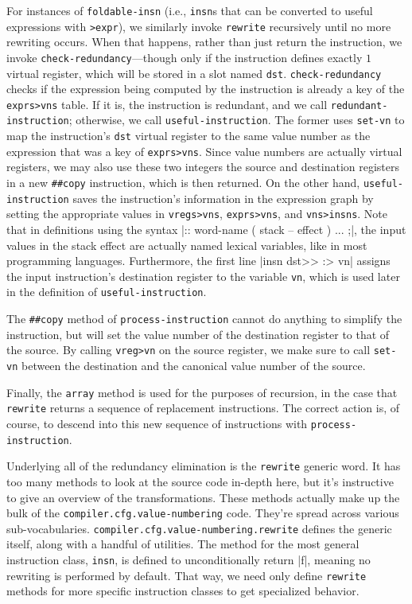 For instances of \Verb|foldable-insn| (i.e., \Verb|insn|s that can be
converted to useful expressions with \Verb|>expr|), we similarly invoke
\Verb|rewrite| recursively until no more rewriting occurs.  When that
happens, rather than just return the instruction, we invoke
\Verb|check-redundancy|---though only if the instruction defines exactly $1$
virtual register, which will be stored in a slot named \Verb|dst|.
\Verb|check-redundancy| checks if the expression being computed by the
instruction is already a key of the \Verb|exprs>vns| table.  If it is, the
instruction is redundant, and we call \Verb|redundant-instruction|;
otherwise, we call \Verb|useful-instruction|.  The former uses
\Verb|set-vn| to map the instruction's \Verb|dst| virtual register to the
same value number as the expression that was a key of \Verb|exprs>vns|.
Since value numbers are actually virtual registers, we may also use these two
integers the source and destination registers in a new \Verb|##copy|
instruction, which is then returned.  On the other hand,
\Verb|useful-instruction| saves the instruction's information in the
expression graph by setting the appropriate values in \Verb|vregs>vns|,
\Verb|exprs>vns|, and \Verb|vns>insns|.  Note that in definitions using the
syntax
%
\factor|:: word-name ( stack -- effect ) ... ;|,
%
the input values in the stack effect are actually named lexical variables, like
in most programming languages.  Furthermore, the
first line
%
\factor|insn dst>> :> vn|
%
assigns the input instruction's destination register to the variable
\Verb|vn|, which is used later in the definition of
\Verb|useful-instruction|.

The \Verb|##copy| method of \Verb|process-instruction| cannot do anything
to simplify the instruction, but will set the value number of the destination
register to that of the source.  By calling \Verb|vreg>vn| on the source
register, we make sure to call \Verb|set-vn| between the destination and the
canonical value number of the source.

Finally, the \Verb|array| method is used for the purposes of recursion, in
the case that \Verb|rewrite| returns a sequence of replacement instructions.
The correct action is, of course, to descend into this new sequence of
instructions with \Verb|process-instruction|.

Underlying all of the redundancy elimination is the \Verb|rewrite| generic
word.  It has too many methods to look at the source code in-depth here, but
it's instructive to give an overview of the transformations.  These methods
actually make up the bulk of the \Verb|compiler.cfg.value-numbering| code.
They're spread across various sub-vocabularies.
\Verb|compiler.cfg.value-numbering.rewrite| defines the generic itself, along
with a handful of utilities.  The method for the most general instruction
class, \Verb|insn|, is defined to unconditionally return \factor|f|, meaning
no rewriting is performed by default.  That way, we need only define
\Verb|rewrite| methods for more specific instruction classes to get
specialized behavior.


